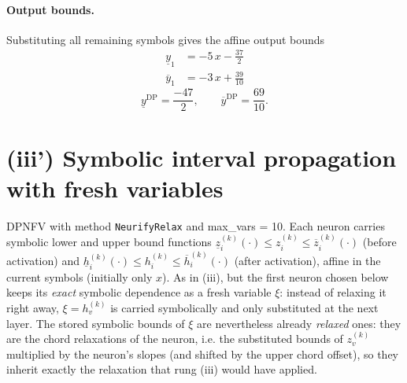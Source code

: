 \documentclass[11pt]{article}
\begin{document}
\paragraph{Output bounds.}
Substituting all remaining symbols gives the affine output bounds
\begin{align*}
\underline{y}_{1} &= -5\,x - \frac{37}{2}
\end{align*}
\begin{align*}
\overline{y}_{1} &= -3\,x + \frac{39}{10}
\end{align*}
\begin{equation*}
\underline{y}^{\text{DP}} = \frac{-47}{2}, \qquad \overline{y}^{\text{DP}} = \frac{69}{10}.
\end{equation*}

\section{(iii') Symbolic interval propagation with fresh variables}
DPNFV with method \texttt{NeurifyRelax} and max\_vars = 10. Each neuron carries symbolic lower and upper bound functions
$\underline{z}^{(k)}_i(\cdot) \le z^{(k)}_i \le \overline{z}^{(k)}_i(\cdot)$ (before activation)
and $\underline{h}^{(k)}_i(\cdot) \le h^{(k)}_i \le \overline{h}^{(k)}_i(\cdot)$ (after activation),
affine in the current symbols (initially only $x$).
As in (iii), but the first neuron chosen below keeps its \emph{exact}
symbolic dependence as a fresh variable $\xi$: instead of relaxing it right away, $\xi = h^{(k)}_v$
is carried symbolically and only substituted at the next layer. The stored symbolic bounds of $\xi$
are nevertheless already \emph{relaxed} ones: they are the chord relaxations of the neuron, i.e.
the substituted bounds of $z^{(k)}_v$ multiplied by the neuron's slopes (and shifted by the upper
chord offset), so they inherit exactly the relaxation that rung (iii) would have applied.
\end{document}
